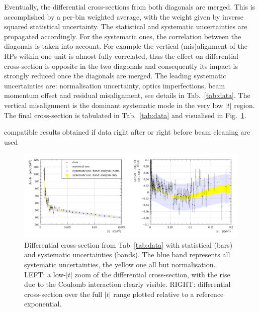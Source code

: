 Eventually, the differential cross-sections from both diagonals are merged. This is accomplished by a per-bin weighted average, with the weight given by inverse squared statistical uncertainty. The statistical and systematic uncertainties are propagated accordingly. For the systematic ones, the correlation between the diagonals is taken into account. For example the vertical (mis)alignment of the RPs within one unit is almost fully correlated, thus the effect on differential cross-section is opposite in the two diagonals and consequently its impact is strongly reduced once the diagonals are merged. The leading systematic uncertainties are: normalisation uncertainty, optics imperfections, beam momentum offset and residual misalignment, see details in Tab.~\ref{tab:data}. The vertical misalignment is the dominant systematic mode in the very low $|t|$ region. The final cross-section is tabulated in Tab.~\ref{tab:data} and visualised in Fig.~\ref{fig:dsdt}.


 compatible results obtained if data right after or right before beam cleaning are used





\begin{figure}
\vskip-5mm
\begin{center}
\includegraphics[width=18cm]{fig/t_dist_tabulation.pdf}
\vskip-3mm
\caption{%
Differential cross-section from Tab~\ref{tab:data} with statistical (bars) and systematic uncertainties (bands). The blue band represents all systematic uncertainties, the yellow one all but normalisation. LEFT: a low-$|t|$ zoom of the differential cross-section, with the rise due to the Coulomb interaction clearly visible. RIGHT: differential cross-section over the full $|t|$ range plotted relative to a reference exponential.
}
\label{fig:dsdt}
\end{center}
\end{figure}

